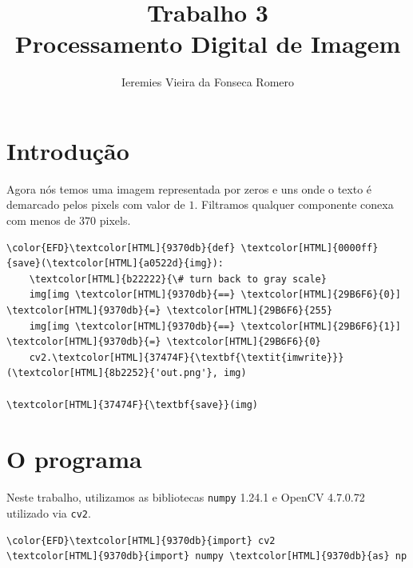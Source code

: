 \documentclass[twocolumn, 10pt]{article}
\author{Ieremies Vieira da Fonseca Romero}
\date{}
\title{Trabalho 3\\\medskip
\large Processamento Digital de Imagem}
\begin{document}
\maketitle

\section*{Introdução}
\label{sec:org993ce77}
Agora nós temos uma imagem representada por zeros e uns onde o texto é demarcado pelos pixels com valor de \(1\).
Filtramos qualquer componente conexa com menos de \(370\) pixels.

\begin{Code}
\begin{Verbatim}
\color{EFD}\textcolor[HTML]{9370db}{def} \textcolor[HTML]{0000ff}{save}(\textcolor[HTML]{a0522d}{img}):
    \textcolor[HTML]{b22222}{\# turn back to gray scale}
    img[img \textcolor[HTML]{9370db}{==} \textcolor[HTML]{29B6F6}{0}] \textcolor[HTML]{9370db}{=} \textcolor[HTML]{29B6F6}{255}
    img[img \textcolor[HTML]{9370db}{==} \textcolor[HTML]{29B6F6}{1}] \textcolor[HTML]{9370db}{=} \textcolor[HTML]{29B6F6}{0}
    cv2.\textcolor[HTML]{37474F}{\textbf{\textit{imwrite}}}(\textcolor[HTML]{8b2252}{'out.png'}, img)

\textcolor[HTML]{37474F}{\textbf{save}}(img)
\end{Verbatim}
\end{Code}

\section*{O programa}
\label{sec:orgeaf3b13}
Neste trabalho, utilizamos as bibliotecas \texttt{numpy} 1.24.1 e OpenCV 4.7.0.72 utilizado via \texttt{cv2}.
\begin{Code}
\begin{Verbatim}
\color{EFD}\textcolor[HTML]{9370db}{import} cv2
\textcolor[HTML]{9370db}{import} numpy \textcolor[HTML]{9370db}{as} np
\end{Verbatim}
\end{Code}
\end{document}
